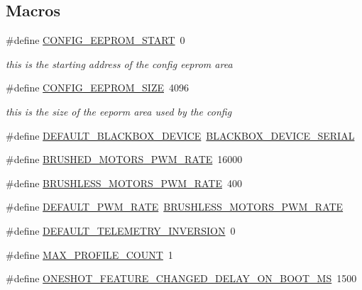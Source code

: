 \subsection*{Macros}
\begin{DoxyCompactItemize}
\item 
\#define \hyperlink{group__config_gaa82407faddc0bb6f2e8e8acc8938ed96}{C\+O\+N\+F\+I\+G\+\_\+\+E\+E\+P\+R\+O\+M\+\_\+\+S\+T\+A\+R\+T}~0
\begin{DoxyCompactList}\small\item\em this is the starting address of the config eeprom area \end{DoxyCompactList}\item 
\#define \hyperlink{group__config_ga05f89c8676acb8b7a7db4bf198965b0b}{C\+O\+N\+F\+I\+G\+\_\+\+E\+E\+P\+R\+O\+M\+\_\+\+S\+I\+Z\+E}~4096
\begin{DoxyCompactList}\small\item\em this is the size of the eeporm area used by the config \end{DoxyCompactList}\item 
\#define \hyperlink{group__config_ga6b8c4cbf895c833d99fec3753854d8de}{D\+E\+F\+A\+U\+L\+T\+\_\+\+B\+L\+A\+C\+K\+B\+O\+X\+\_\+\+D\+E\+V\+I\+C\+E}~\hyperlink{config_2blackbox_8h_a877d661ca083c1e109540103b63c8b65a71fd6b602cdb5e5dd20fcea08d3ce7a4}{B\+L\+A\+C\+K\+B\+O\+X\+\_\+\+D\+E\+V\+I\+C\+E\+\_\+\+S\+E\+R\+I\+A\+L}
\item 
\#define \hyperlink{group__config_ga98a6c026bec6ab29554cfb7796af8024}{B\+R\+U\+S\+H\+E\+D\+\_\+\+M\+O\+T\+O\+R\+S\+\_\+\+P\+W\+M\+\_\+\+R\+A\+T\+E}~16000
\item 
\#define \hyperlink{group__config_ga5a04e5992ea75d8544421b541ef6ca7a}{B\+R\+U\+S\+H\+L\+E\+S\+S\+\_\+\+M\+O\+T\+O\+R\+S\+\_\+\+P\+W\+M\+\_\+\+R\+A\+T\+E}~400
\item 
\#define \hyperlink{group__config_ga450eded8e86f47c2209c88fdc563d960}{D\+E\+F\+A\+U\+L\+T\+\_\+\+P\+W\+M\+\_\+\+R\+A\+T\+E}~\hyperlink{group__config_ga5a04e5992ea75d8544421b541ef6ca7a}{B\+R\+U\+S\+H\+L\+E\+S\+S\+\_\+\+M\+O\+T\+O\+R\+S\+\_\+\+P\+W\+M\+\_\+\+R\+A\+T\+E}
\item 
\#define \hyperlink{group__config_ga34bad804a5ac2075c08aa3f833bc8fcc}{D\+E\+F\+A\+U\+L\+T\+\_\+\+T\+E\+L\+E\+M\+E\+T\+R\+Y\+\_\+\+I\+N\+V\+E\+R\+S\+I\+O\+N}~0
\item 
\#define \hyperlink{group__config_gacfd2f8c35eaccee63c54b7b6d528e8bc}{M\+A\+X\+\_\+\+P\+R\+O\+F\+I\+L\+E\+\_\+\+C\+O\+U\+N\+T}~1
\item 
\#define \hyperlink{group__config_gaded80893ebf962ab49ad6318fce24f14}{O\+N\+E\+S\+H\+O\+T\+\_\+\+F\+E\+A\+T\+U\+R\+E\+\_\+\+C\+H\+A\+N\+G\+E\+D\+\_\+\+D\+E\+L\+A\+Y\+\_\+\+O\+N\+\_\+\+B\+O\+O\+T\+\_\+\+M\+S}~1500
\end{DoxyCompactItemize}
